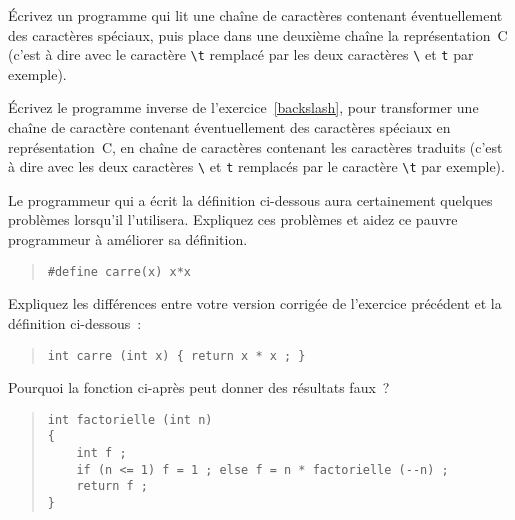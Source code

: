 Écrivez un programme qui lit une chaîne de caractères contenant
éventuellement des caractères spéciaux, puis place dans une deuxième
chaîne la représentation~C (c'est à dire avec le caractère \verb:\t:
remplacé par les deux caractères \verb:\: et \verb:t: par exemple).


\question

Écrivez le programme inverse de l'exercice~\ref {backslash}, pour
transformer une chaîne de caractère contenant éventuellement des
caractères spéciaux en représentation~C, en chaîne de caractères
contenant les caractères traduits (c'est à dire avec les deux caractères
\verb:\:  et \verb:t:  remplacés par le caractère \verb:\t:  par
exemple).


\question

Le programmeur qui a écrit la définition ci-dessous aura certainement
quelques problèmes lorsqu'il l'utilisera.
Expliquez ces problèmes et
aidez ce pauvre programmeur à améliorer sa définition.

\begin {quote}
\begin {verbatim}
#define carre(x) x*x
\end{verbatim}
\end {quote}


\question

Expliquez les différences entre votre version corrigée de l'exercice
précédent et la définition ci-dessous~:

\begin {quote}
\begin {verbatim}
int carre (int x) { return x * x ; }
\end{verbatim}
\end {quote}



\question

Pourquoi la fonction ci-après peut donner des résultats faux~?

\begin {quote}
\small
\begin {verbatim}
int factorielle (int n)
{
    int f ;
    if (n <= 1) f = 1 ; else f = n * factorielle (--n) ;
    return f ;
}
\end{verbatim}
\end {quote}


\question
    \label {lire16}


